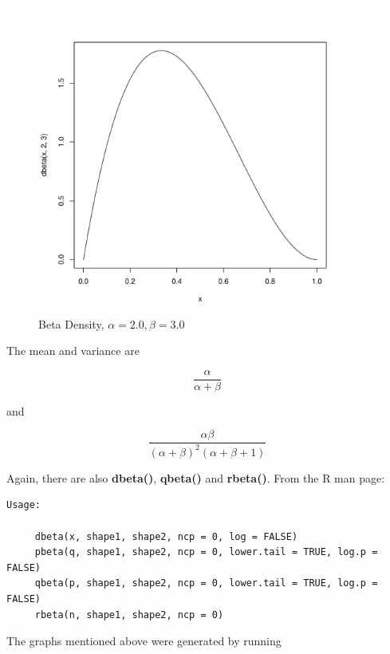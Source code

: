 \begin{figure}
\centerline{
\includegraphics[width=4in]{Beta2030.pdf}
}
\caption{Beta Density, $\alpha = 2.0, \beta = 3.0$}
\label{betadens2030}
\end{figure}

% 
% 

The mean and variance are

\begin{equation}
\frac{\alpha}{\alpha+\beta}
\end{equation}

and

\begin{equation}
\frac
{\alpha \beta}
{(\alpha+\beta)^2 (\alpha+\beta+1)}
\end{equation}

Again, there are also {\bf dbeta()}, {\bf qbeta()} and {\bf rbeta()}.
From the R man page:

\begin{lstlisting}
Usage:

     dbeta(x, shape1, shape2, ncp = 0, log = FALSE)
     pbeta(q, shape1, shape2, ncp = 0, lower.tail = TRUE, log.p = FALSE)
     qbeta(p, shape1, shape2, ncp = 0, lower.tail = TRUE, log.p = FALSE)
     rbeta(n, shape1, shape2, ncp = 0)
\end{lstlisting}

The graphs mentioned above were generated by running

